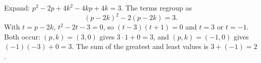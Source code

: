 Expand: $p^2-2p+4k^2-4kp+4k=3$. The terms regroup as
\[
(p-2k)^2-2(p-2k)=3 .
\]
With $t=p-2k$, $t^2-2t-3=0$, so $(t-3)(t+1)=0$ and $t=3$ or $t=-1$. Both occur: $(p,k)=(3,0)$ gives $3\cdot1+0=3$, and $(p,k)=(-1,0)$ gives $(-1)(-3)+0=3$. The sum of the greatest and least values is $3+(-1)=\boxed{2}$.
